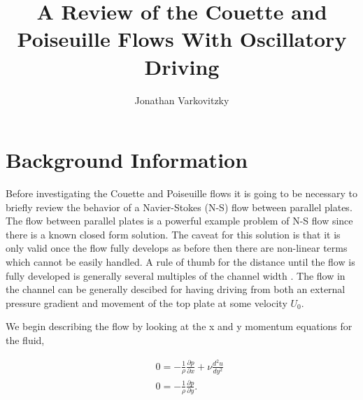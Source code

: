 \documentclass[a4paper,12pt,titlepage]{article}
\begin{document}
\newcommand{\ul}{\underline}
\newcommand{\p}{\partial}

\title{A Review of the Couette and Poiseuille Flows With Oscillatory Driving}
\author{Jonathan Varkovitzky}
\maketitle


\pagestyle{plain} %
\tableofcontents


\setcounter{page}{2}

\newpage




\section{Background Information}

Before investigating the Couette and Poiseuille flows it is going to be necessary to briefly review the behavior of a Navier-Stokes (N-S) flow between parallel plates.  The flow between parallel plates is a powerful example problem of N-S flow since there is a known closed form solution. The caveat for this solution is that it is only valid once the flow fully develops as before then there are non-linear terms which cannot be easily handled.  A rule of thumb for the distance until the flow is fully developed is generally several multiples of the channel width \cite{kundu}.  The flow in the channel can be generally descibed for having driving from both an external pressure gradient and movement of the top plate at some velocity $U_0$.

We begin describing the flow by looking at the x and y momentum equations for the fluid,

\begin{eqnarray}
&& 0 = -\frac{1}{\rho} \frac{\p p}{\p x} + \nu \frac{d^2 u}{dy^2}\nonumber \\
&& 0 = -\frac{1}{\rho} \frac{\p p}{\p y}.
\end{eqnarray}
\end{document}
